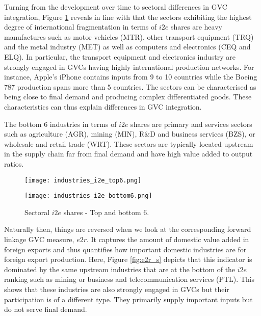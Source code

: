 \documentclass[11pt,a4paper]{article}
\begin{document}
Turning from the development over time to sectoral differences in GVC integration, Figure \ref{fig:i2e_s} reveals in line with \citet{rojoguno12a} that the sectors exhibiting the highest degree of international fragmentation in terms of $i2e$ shares are heavy manufactures such as motor vehicles (MTR), other transport equipment (TRQ) and the metal industry (MET) as well as computers and electronics (CEQ and ELQ). In particular, the transport equipment and electronics industry are strongly engaged in GVCs having highly international production networks. For instance, Apple's iPhone contains inputs from 9 to 10 countries while the Boeing 787 production spans more than 5 countries. The sectors can be characterised as being close to final demand and producing complex differentiated goods. These characteristics can thus explain differences in GVC integration.

The bottom 6 industries in terms of $i2e$ shares are primary and services sectors such as agriculture (AGR), mining (MIN), R\&D and business services (BZS), or wholesale and retail trade (WRT). These sectors are typically located upstream in the supply chain far from final demand and have high value added to output ratios.

\begin{figure}
\centering
\begin{minipage}{0.45\textwidth}
\centering
\texttt{[image: industries\_i2e\_top6.png]}
\end{minipage}\hfill
\begin{minipage}{0.45\textwidth}
\centering
\texttt{[image: industries\_i2e\_bottom6.png]}
\end{minipage}
\caption{Sectoral $i2e$ shares - Top and bottom 6.}
\label{fig:i2e_s}
\end{figure}

Naturally then, things are reversed when we look at the corresponding forward linkage GVC measure, $e2r$. It captures the amount of domestic value added in foreign exports and thus quantifies how important domestic industries are for foreign export production. Here, Figure \ref{fig:e2r_s} depicts that this indicator is dominated by the same upstream industries that are at the bottom of the $i2e$ ranking such as mining or business and telecommunication services (PTL). This shows that these industries are also strongly engaged in GVCs but their participation is of a different type. They primarily supply important inputs but do not serve final demand. 
\end{document}
